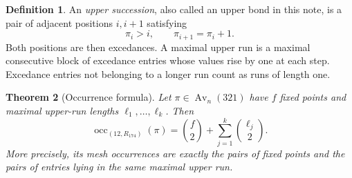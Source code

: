 \documentclass[11pt,letterpaper]{article}
\numberwithin{equation}{section}
\newtheorem{theorem}{Theorem}[section]
\theoremstyle{definition}
\newtheorem{definition}[theorem]{Definition}
\DeclareMathOperator{\Av}{Av}
\DeclareMathOperator{\occ}{occ}
\newcommand{\Rone}{R_{174}}
\begin{document}
\begin{definition}
An \emph{upper succession}, also called an upper bond in this note, is a
pair of adjacent positions $i,i+1$ satisfying
\begin{equation}
 \pi_i>i,\qquad \pi_{i+1}=\pi_i+1.
 \label{eq:bond}
\end{equation}
Both positions are then excedances. A maximal upper run is a maximal
consecutive block of excedance entries whose values rise by one at each
step. Excedance entries not belonging to a longer run count as runs of
length one.
\end{definition}

\begin{theorem}[Occurrence formula]
\label{thm:occ}
Let $\pi\in\Av_n(321)$ have $f$ fixed points and maximal upper-run lengths
$\ell_1,\ldots,\ell_k$. Then
\begin{equation}
 \boxed{\displaystyle
 \occ_{(12,\Rone)}(\pi)
   =\binom f2+\sum_{j=1}^k\binom{\ell_j}{2}.}
 \label{eq:occ}
\end{equation}
More precisely, its mesh occurrences are exactly the pairs of fixed points
and the pairs of entries lying in the same maximal upper run.
\end{theorem}
\end{document}
